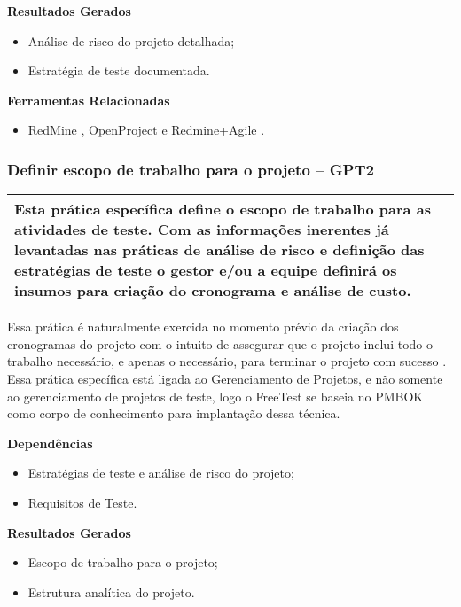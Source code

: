 \textbf{Resultados Gerados}
\begin{itemize}
    \item Análise de risco do projeto detalhada;
    \item Estratégia de teste documentada.
\end{itemize}

\textbf{Ferramentas Relacionadas}
\begin{itemize}
    \item RedMine \cite{Redmine}, OpenProject \cite{OpenProject} e Redmine+Agile \cite{RedmineUP}.
\end{itemize}


\subsubsection{Definir escopo de trabalho para o projeto – GPT2}
\label{sec:gpt2}

\begin{table}[!ht]
\centering
\begin{tabular}{|p{130mm}|}
\hline
Esta prática específica define o escopo de trabalho para as atividades de teste. Com as informações inerentes já levantadas nas práticas de análise de risco e definição das estratégias de teste o gestor e/ou a equipe definirá os insumos para criação do cronograma e análise de custo. \\ 
\hline
\end{tabular}
\end{table}

Essa prática é naturalmente exercida no momento prévio da criação dos cronogramas do projeto com o intuito de assegurar que o projeto inclui todo o trabalho necessário, e apenas o necessário, para terminar o projeto com sucesso \cite{pmbok2014}. Essa prática específica está ligada ao Gerenciamento de Projetos, e não somente ao gerenciamento de projetos de teste, logo o FreeTest se baseia no PMBOK como corpo de conhecimento para implantação dessa técnica.

\textbf{Dependências}
\begin{itemize}
    \item Estratégias de teste e análise de risco do projeto;
    \item Requisitos de Teste.
\end{itemize}

\textbf{Resultados Gerados}
\begin{itemize}
    \item Escopo de trabalho para o projeto;
    \item Estrutura analítica do projeto.
\end{itemize}

